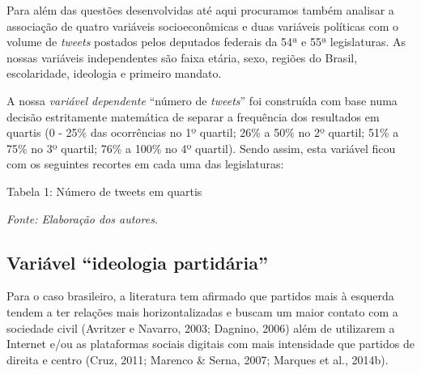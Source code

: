 \noindent{}Para além das questões desenvolvidas até aqui procuramos também analisar
a associação de quatro variáveis socioeconômicas e duas variáveis
políticas com o volume de \emph{tweets} postados pelos deputados
federais da 54ª e 55ª legislaturas. As nossas variáveis independentes
são faixa etária, sexo, regiões do Brasil, escolaridade, ideologia e
primeiro mandato.

A nossa \emph{variável dependente} ``número de \emph{tweets}'' foi
construída com base numa decisão estritamente matemática de separar a
frequência dos resultados em quartis (0 - 25\% das ocorrências no 1º
quartil; 26\% a 50\% no 2º quartil; 51\% a 75\% no 3º quartil; 76\% a
100\% no 4º quartil). Sendo assim, esta variável ficou com os seguintes
recortes em cada uma das legislaturas:

\begin{center}
Tabela 1: Número de tweets em quartis\bigskip

{\footnotesize\emph{Fonte: Elaboração dos autores.}}
\end{center}

\subsection{Variável ``ideologia partidária''}

Para o caso brasileiro, a literatura tem afirmado que partidos mais à
esquerda tendem a ter relações mais horizontalizadas e buscam um maior
contato com a sociedade civil (Avritzer e Navarro, 2003; Dagnino, 2006)
além de utilizarem a Internet e/ou as plataformas sociais digitais com
mais intensidade que partidos de direita e centro (Cruz, 2011; Marenco
\& Serna, 2007; Marques et al., 2014b).


